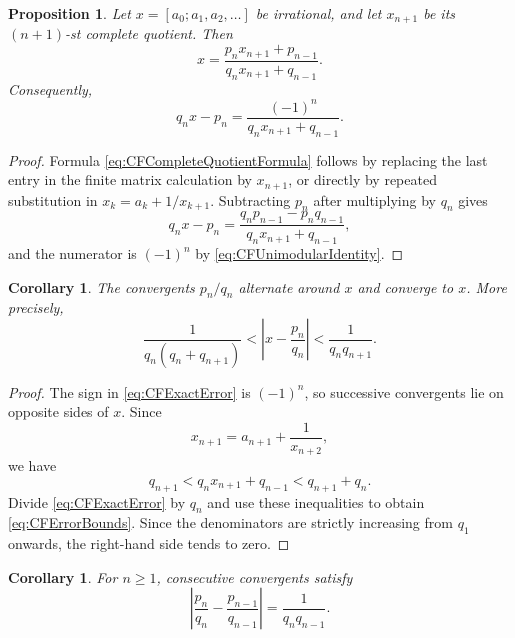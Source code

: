 \documentclass{book}
\newtheorem{proposition}[definition]{Proposition}
\newtheorem{corollary}[definition]{Corollary}
\begin{document}
\begin{proposition}\label{prop:CFCompleteQuotientFormula}
  Let \(x=[a_0;a_1,a_2,\ldots]\) be irrational, and let \(x_{n+1}\) be its
  \((n+1)\)-st complete quotient. Then
  \begin{equation}\label{eq:CFCompleteQuotientFormula}
    x=\frac{p_nx_{n+1}+p_{n-1}}
            {q_nx_{n+1}+q_{n-1}}.
  \end{equation}
  Consequently,
  \begin{equation}\label{eq:CFExactError}
    q_nx-p_n
    =\frac{(-1)^n}{q_nx_{n+1}+q_{n-1}}.
  \end{equation}
\end{proposition}

\begin{proof}
  Formula \eqref{eq:CFCompleteQuotientFormula} follows by replacing the last
  entry in the finite matrix calculation by \(x_{n+1}\), or directly by
  repeated substitution in \(x_k=a_k+1/x_{k+1}\). Subtracting \(p_n\) after
  multiplying by \(q_n\) gives
  \[
    q_nx-p_n
    =\frac{q_np_{n-1}-p_nq_{n-1}}
           {q_nx_{n+1}+q_{n-1}},
  \]
  and the numerator is \((-1)^n\) by
  \eqref{eq:CFUnimodularIdentity}.
\end{proof}

\begin{corollary}\label{cor:CFConvergenceAndBounds}
  The convergents \(p_n/q_n\) alternate around \(x\) and converge to \(x\).
  More precisely,
  \begin{equation}\label{eq:CFErrorBounds}
    \frac{1}{q_n(q_n+q_{n+1})}
    <
    \left|x-\frac{p_n}{q_n}\right|
    <
    \frac{1}{q_nq_{n+1}}.
  \end{equation}
\end{corollary}

\begin{proof}
  The sign in \eqref{eq:CFExactError} is \((-1)^n\), so successive
  convergents lie on opposite sides of \(x\). Since
  \[
    x_{n+1}=a_{n+1}+\frac1{x_{n+2}},
  \]
  we have
  \[
    q_{n+1}
    <q_nx_{n+1}+q_{n-1}
    <q_{n+1}+q_n.
  \]
  Divide \eqref{eq:CFExactError} by \(q_n\) and use these inequalities to
  obtain \eqref{eq:CFErrorBounds}. Since the denominators are strictly
  increasing from \(q_1\) onwards, the right-hand side tends to zero.
\end{proof}

\begin{corollary}\label{cor:CFConsecutiveDifference}
  For \(n\geq1\), consecutive convergents satisfy
  \[
    \left|\frac{p_n}{q_n}-\frac{p_{n-1}}{q_{n-1}}\right|
    =\frac{1}{q_nq_{n-1}}.
  \]
\end{corollary}
\end{document}
